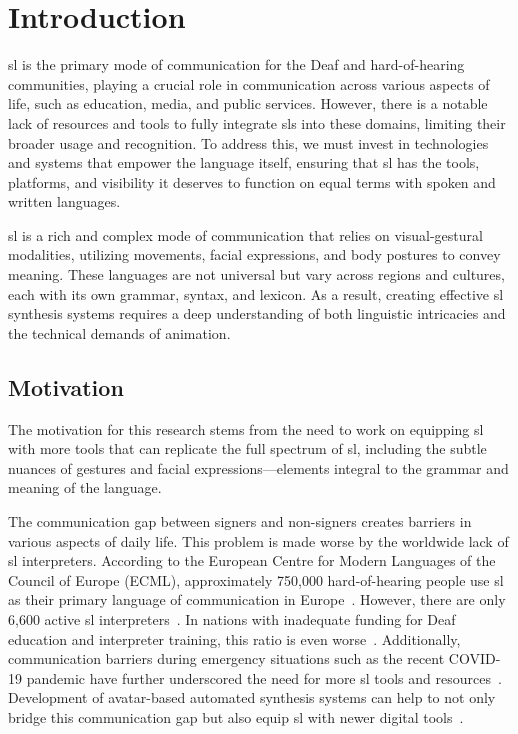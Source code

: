 \documentclass[../../main.tex]
{subfiles}
\begin{document}
\chapter{Introduction}
\label{ch:introduction}

\gls{sl} is the primary mode of communication for the Deaf and hard-of-hearing communities, playing a crucial role in communication across various aspects of life, such as education, media, and public services. However, there is a notable lack of resources and tools to fully integrate \gls{sl}s into these domains, limiting their broader usage and recognition. To address this, we must invest in technologies and systems that empower the language itself, ensuring that \gls{sl} has the tools, platforms, and visibility it deserves to function on equal terms with spoken and written languages.

\gls{sl} is a rich and complex mode of communication that relies on visual-gestural modalities, utilizing movements, facial expressions, and body postures to convey meaning. These languages are not universal but vary across regions and cultures, each with its own grammar, syntax, and lexicon. As a result, creating effective \gls{sl} synthesis systems requires a deep understanding of both linguistic intricacies and the technical demands of animation.

\section{Motivation}
\label{ch:introduction:motivation}

The motivation for this research stems from the need to work on equipping \gls{sl} with more tools that can replicate the full spectrum of \gls{sl}, including the subtle nuances of gestures and facial expressions—elements integral to the grammar and meaning of the language.

The communication gap between signers and non-signers creates barriers in various aspects of daily life. This problem is made worse by the worldwide lack of \gls{sl} interpreters. According to the European Centre for Modern Languages of the Council of Europe (ECML), approximately 750,000 hard-of-hearing people use \gls{sl} as their primary language of communication in Europe~\cite{sl_interpreters}. However, there are only 6,600 active \gls{sl} interpreters~\cite{sl_interpreters}. In nations with inadequate funding for Deaf education and interpreter training, this ratio is even worse~\cite{hrw2019}. Additionally, communication barriers during emergency situations such as the recent COVID-19 pandemic have further underscored the need for more \gls{sl} tools and resources~\cite{panko2021deaf}. Development of avatar-based automated synthesis systems can help to not only bridge this communication gap but also equip \gls{sl} with newer digital tools~\cite{kipp2011sign}.
\end{document}
